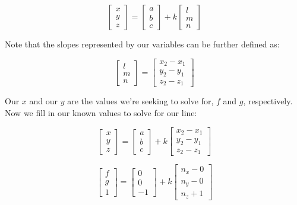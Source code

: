 \documentclass{article}
\begin{document}
\begin{equation}
    \begin{bmatrix}
        x \\ y \\ z
    \end{bmatrix} = \begin{bmatrix}
        a \\ b \\ c 
    \end{bmatrix} + k \begin{bmatrix}
        l \\ m \\ n
    \end{bmatrix}
\end{equation}

\noindent Note that the slopes represented by our variables can be further defined as:

\begin{equation}
    \begin{bmatrix}
        l \\ m \\ n
    \end{bmatrix} = \begin{bmatrix}
        x_2 - x_1 \\ y_2 - y_1 \\ z_2 - z_1
    \end{bmatrix}
\end{equation}

\noindent Our $x$ and our $y$ are the values we're seeking to solve for, $f$ and $g$, respectively. Now we fill in our known values to solve for our line:

\begin{equation}
    \begin{bmatrix}
        x \\ y \\ z
    \end{bmatrix} = \begin{bmatrix}
        a \\ b \\ c 
    \end{bmatrix} + k \begin{bmatrix}
        x_2 - x_1 \\ y_2 - y_1 \\ z_2 - z_1
    \end{bmatrix}
\end{equation}

\begin{equation}
    \begin{bmatrix}
        f \\ g \\ 1
    \end{bmatrix} = \begin{bmatrix}
        0 \\ 0 \\ -1 
    \end{bmatrix} + k \begin{bmatrix}
        n_x - 0 \\ n_y - 0 \\ n_z + 1
    \end{bmatrix}
\end{equation}
\end{document}
